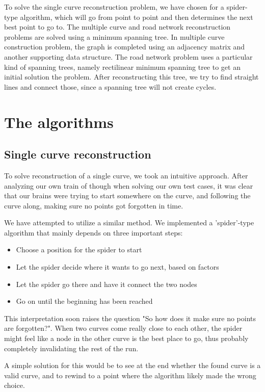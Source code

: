 \documentclass[11pt]{article}
\begin{document}
To solve the single curve reconstruction problem, we have chosen for a spider-type algorithm, which will go from point to point and then determines the next best point to go to.
The multiple curve and road network reconstruction problems are solved using a minimum spanning tree. In multiple curve construction problem, the graph is completed using an adjacency matrix and another supporting data structure. The road network problem uses a particular kind of spanning trees, namely rectilinear minimum spanning tree to get an initial solution the problem. After reconstructing this tree, we try to find straight lines and connect those, since a spanning tree will not create cycles.

\newpage
\section{The algorithms}
\label{se:algorithms}

\subsection{Single curve reconstruction}
To solve reconstruction of a single curve, we took an intuitive approach. After analyzing our own train of though when solving our own test cases, it was clear that our brains were trying to start somewhere on the curve, and following the curve along, making sure no points got forgotten in time.

We have attempted to utilize a similar method. We implemented a 'spider'-type algorithm that mainly depends on three important steps:
\begin{itemize}
\item Choose a position for the spider to start
\item Let the spider decide where it wants to go next, based on factors
\item Let the spider go there and have it connect the two nodes
\item Go on until the beginning has been reached
\end{itemize}

This interpretation soon raises the question "So how does it make sure no points are forgotten?".
When two curves come really close to each other, the spider might feel like a node in the other curve is the best place to go, thus probably completely invalidating the rest of the run.

A simple solution for this would be to see at the end whether the found curve is a valid curve, and to rewind to a point where the algorithm likely made the wrong choice.
\end{document}
